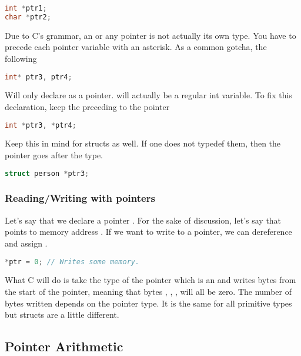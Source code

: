 \begin{lstlisting}[language=C]
int *ptr1;
char *ptr2;
\end{lstlisting}

Due to C's grammar, an  or any pointer is not actually its
own type. You have to precede each pointer variable with an asterisk. As
a common gotcha, the following

\begin{lstlisting}[language=C]
int* ptr3, ptr4;
\end{lstlisting}

Will only declare  as a pointer.  will
actually be a regular int variable. To fix this declaration, keep the
\keyword{*} preceding to the pointer

\begin{lstlisting}[language=C]
int *ptr3, *ptr4;
\end{lstlisting}

Keep this in mind for structs as well. If one does not typedef them, then the pointer goes after the type.

\begin{lstlisting}[language=C]
struct person *ptr3;
\end{lstlisting}

\subsubsection{Reading/Writing with pointers}

Let's say that we declare a pointer . For the sake of
discussion, let's say that  points to memory address
. If we want to write to a pointer, we can dereference
and assign .

\begin{lstlisting}[language=C]
*ptr = 0; // Writes some memory.
\end{lstlisting}

What C will do is take the type of the pointer which is an 
and writes  bytes from the start of the pointer,
meaning that bytes , , ,
 will all be zero. The number of bytes written depends on
the pointer type. It is the same for all primitive types but structs are
a little different.

\subsection{Pointer Arithmetic}

